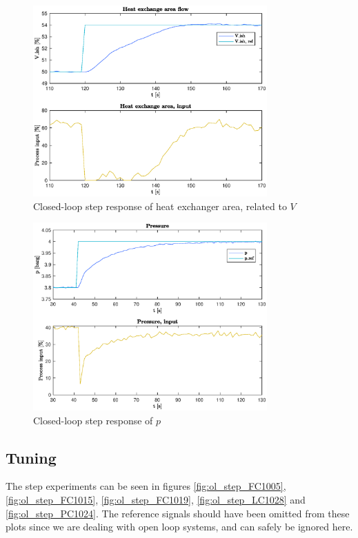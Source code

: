 \documentclass[12pt]{article}
\begin{document}
\begin{figure}[p]
\centering
\includegraphics[width=0.8\textwidth]{../Systemanalyse/Log_Data_to_Matlab/Figurer/Stegeksperimenter/LC1028_step.eps}
\caption{Closed-loop step response of heat exchanger area, related to $V$}
\label{fig:cl_step_LC1028}
\end{figure}

\begin{figure}[p]
\centering
\includegraphics[width=0.8\textwidth]{../Systemanalyse/Log_Data_to_Matlab/Figurer/Stegeksperimenter/PC1024_step.eps}
\caption{Closed-loop step response of $p$}
\label{fig:cl_step_PC1024}
\end{figure}

\subsection{Tuning}
The step experiments can be seen in figures \ref{fig:ol_step_FC1005}, \ref{fig:ol_step_FC1015}, \ref{fig:ol_step_FC1019}, \ref{fig:ol_step_LC1028} and \ref{fig:ol_step_PC1024}. The reference signals should have been omitted from these plots since we are dealing with open loop systems, and can safely be ignored here.
\end{document}
